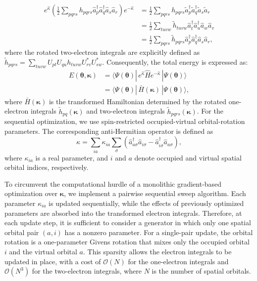 \documentclass[
 reprint,
 amsmath,amssymb,
 aps,
 physrev,
]{revtex4-2}
\begin{document}
%
\begin{equation}
    \label{eq:two_electron_transform}
    \begin{split}
        e^{\hat{\kappa}} \left( \frac{1}{2} \sum_{pqrs} h_{pqrs} \hat{a}_p^\dagger \hat{a}_q^\dagger \hat{a}_s \hat{a}_r \right) e^{-\hat{\kappa}}
         & = \frac{1}{2} \sum_{pqrs} h_{pqrs} \tilde{a}_p^\dagger \tilde{a}_q^\dagger \tilde{a}_s \tilde{a}_r         \\
         & = \frac{1}{2} \sum_{tuvw} \tilde{h}_{tuvw} \hat{a}_{t}^\dagger \hat{a}_{u}^\dagger \hat{a}_{w} \hat{a}_{v} \\
         & = \frac{1}{2} \sum_{pqrs} \tilde{h}_{pqrs} \hat{a}_p^\dagger \hat{a}_q^\dagger \hat{a}_s \hat{a}_r,
    \end{split}
\end{equation}
%
where the rotated two-electron integrals are explicitly defined as \( \tilde{h}_{pqrs} = \sum_{tuvw} U_{pt} U_{qu} h_{tuvw} U_{rv}^* U_{sw}^* \).
Consequently, the total energy is expressed as:
%
\begin{equation}
    \label{eq:energy_kappa}
    \begin{split}
        E(\bm{\theta}, \bm{\kappa}) & = \langle \Psi(\bm{\theta}) | \, e^{\hat{\kappa}} \hat{H} e^{-\hat{\kappa}} \, | \Psi(\bm{\theta}) \rangle \\
                                    & = \langle \Psi(\bm{\theta}) | \, \bar{H}(\bm{\kappa}) \, | \Psi(\bm{\theta}) \rangle,
    \end{split}
\end{equation}
%
where \( \bar{H}(\bm{\kappa}) \) is the transformed Hamiltonian determined by the rotated one-electron integrals \( \tilde{h}_{pq}(\bm{\kappa}) \) and two-electron integrals \( \tilde{h}_{pqrs}(\bm{\kappa}) \).
%
For the sequential optimization, we use spin-restricted occupied-virtual orbital-rotation parameters. The corresponding anti-Hermitian operator is defined as
%
\begin{equation}
    \label{eq:spin_summed_kappa}
    \hat{\kappa}
    =
    \sum_{ia}
    \kappa_{ia}
    \sum_{\sigma}
    \left(
    \hat{a}_{a\sigma}^{\dagger}
    \hat{a}_{i\sigma}
    -
    \hat{a}_{i\sigma}^{\dagger}
    \hat{a}_{a\sigma}
    \right),
\end{equation}
%
where \( \kappa_{ia} \) is a real parameter, and \( i \) and \( a \) denote occupied and virtual spatial orbital indices, respectively.

To circumvent the computational hurdle of a monolithic gradient-based optimization over \( \bm{\kappa} \), we implement a pairwise sequential sweep algorithm. Each parameter \( \kappa_{ia} \) is updated sequentially, while the effects of previously optimized parameters are absorbed into the transformed electron integrals. Therefore, at each update step, it is sufficient to consider a generator in which only one spatial orbital pair \( (a, i) \) has a nonzero parameter.
%
For a single-pair update, the orbital rotation is a one-parameter Givens rotation that mixes only the occupied orbital \( i \) and the virtual orbital \( a  \). This sparsity allows the electron integrals to be updated in place, with a cost of \( \mathcal{O}(N) \) for the one-electron integrals and \( \mathcal{O}(N^3) \) for the two-electron integrals, where \( N \) is the number of spatial orbitals.
%
\end{document}
